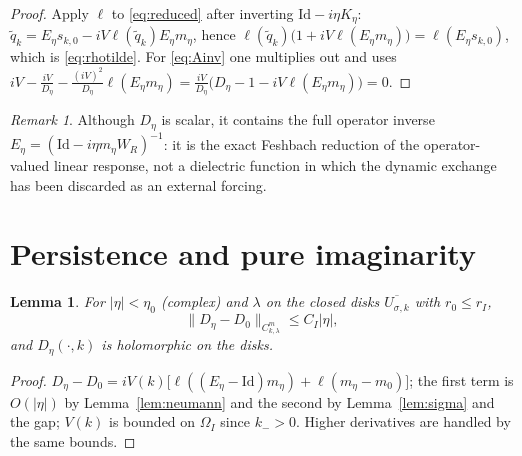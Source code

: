 \documentclass[11pt,a4paper]{amsart}
\newtheorem{lemma}[theorem]{Lemma}
\theoremstyle{definition}
\theoremstyle{remark}
\newtheorem{remark}[theorem]{Remark}
\newcommand{\Id}{\mathrm{Id}}
\newcommand{\ellf}{\ell}
\begin{document}
\begin{proof}
Apply $\ellf$ to \eqref{eq:reduced} after inverting $\Id-i\eta K_\eta$:
$\widetilde q_k=E_\eta s_{k,0}-iV\ellf(\widetilde q_k)E_\eta m_\eta$, hence
$\ellf(\widetilde q_k)\bigl(1+iV\ellf(E_\eta m_\eta)\bigr)=\ellf(E_\eta s_{k,0})$, which is \eqref{eq:rhotilde}. For \eqref{eq:Ainv} one multiplies out and uses
$iV-\frac{iV}{D_\eta}-\frac{(iV)^2}{D_\eta}\ellf(E_\eta m_\eta)
=\frac{iV}{D_\eta}\bigl(D_\eta-1-iV\ellf(E_\eta m_\eta)\bigr)=0$.
\end{proof}

\begin{remark}\label{rem:scalarbutexact}
Although $D_\eta$ is scalar, it contains the full operator inverse $E_\eta=(\Id-i\eta m_\eta W_R)^{-1}$: it is the exact Feshbach reduction of the operator-valued linear response, not a dielectric function in which the dynamic exchange has been discarded as an external forcing.
\end{remark}

\section{Persistence and pure imaginarity}\label{sec:persistence}

\begin{lemma}\label{lem:Dpert}
For $|\eta|<\eta_0$ \textup{(}complex\textup{)} and $\lambda$ on the closed disks $\overline{U_{\sigma,k}}$ with $r_0\le r_I$,
\begin{equation}\label{eq:Dpert}
\|D_\eta-D_0\|_{C^m_{k,\lambda}}\le C_I|\eta| ,
\end{equation}
and $D_\eta(\cdot,k)$ is holomorphic on the disks.
\end{lemma}

\begin{proof}
$D_\eta-D_0=iV(k)\bigl[\ellf((E_\eta-\Id)m_\eta)+\ellf(m_\eta-m_0)\bigr]$; the first term is $O(|\eta|)$ by Lemma~\ref{lem:neumann} and the second by Lemma~\ref{lem:sigma} and the gap; $V(k)$ is bounded on $\Omega_I$ since $k_->0$. Higher derivatives are handled by the same bounds.
\end{proof}
\end{document}
